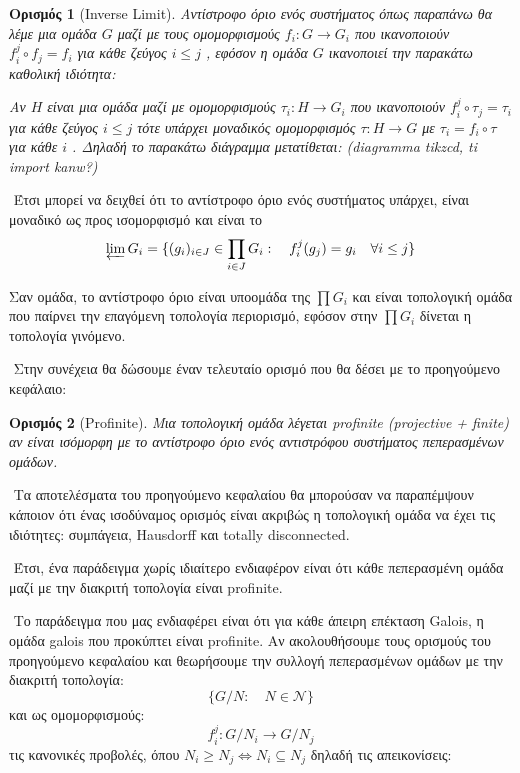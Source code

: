 \documentclass[oneside,a4paper]{article}
\newtheorem*{defn}{Ορισμός}
\newcommand {\tl}{\textlatin}
\begin{document}
\begin{defn}[\tl{Inverse Limit}] Αντίστροφο όριο ενός συστήματος όπως παραπάνω θα λέμε μια ομάδα $G$ μαζί με τους ομομορφισμούς $f_i : G \rightarrow G_i$ που ικανοποιούν $f^j_i \circ f_j = f_i$ για κάθε ζεύγος $i \leq j$ , εφόσον η ομάδα $G$ ικανοποιεί την παρακάτω καθολική ιδιότητα:

Αν $H$ είναι μια ομάδα μαζί με ομομορφισμούς $\tau_i : H \rightarrow G_i$ που ικανοποιούν $f^j_i \circ \tau_j = \tau_i$ για κάθε ζεύγος $i\leq j$ τότε υπάρχει μοναδικός ομομορφισμός $\tau : H  \rightarrow G$ με $\tau_i = f_i \circ \tau$ για κάθε $i$ . Δηλαδή το παρακάτω διάγραμμα μετατίθεται:
(diagramma tikzcd, ti import kanw?)
\end{defn}

$ $\newline
Έτσι μπορεί να δειχθεί ότι το αντίστροφο όριο ενός συστήματος υπάρχει, είναι μοναδικό ως προς ισομορφισμό και είναι το 
$$\varprojlim G_i  = \{(g_i)_{i \in J} \in \prod\limits_{i \in J} G_i : \quad f^j_i (g_j) = g_i \quad\forall i\leq j\}$$

\noindent Σαν ομάδα, το αντίστροφο όριο είναι υποομάδα της $\prod G_i$ και είναι τοπολογική ομάδα που παίρνει την επαγόμενη τοπολογία περιορισμό, εφόσον στην $\prod G_i$ δίνεται η τοπολογία γινόμενο.

$ $\newline
\noindent Στην συνέχεια θα δώσουμε έναν τελευταίο ορισμό που θα δέσει με το προηγούμενο κεφάλαιο:

\begin{defn}[\tl{Profinite}]Μια τοπολογική ομάδα λέγεται \tl{profinite (projective + finite)} αν είναι ισόμορφη με το αντίστροφο όριο ενός αντιστρόφου συστήματος πεπερασμένων ομάδων. 
\end{defn}

$ $\newline
\noindent Τα αποτελέσματα του προηγούμενο κεφαλαίου θα μπορούσαν να παραπέμψουν κάποιον ότι ένας ισοδύναμος ορισμός είναι ακριβώς η τοπολογική ομάδα να έχει τις ιδιότητες: συμπάγεια, \tl{Hausdorff} και totally disconnected.

$ $\newline
\noindent Έτσι, ένα παράδειγμα χωρίς ιδιαίτερο ενδιαφέρον είναι ότι κάθε πεπερασμένη ομάδα μαζί με την διακριτή τοπολογία είναι \tl{profinite}.

$ $\newline
\noindent Το παράδειγμα που μας ενδιαφέρει είναι ότι για κάθε άπειρη επέκταση Galois, η ομάδα galois που προκύπτει είναι profinite. Αν ακολουθήσουμε τους ορισμούς του προηγούμενο κεφαλαίου και θεωρήσουμε την συλλογή πεπερασμένων ομάδων με την διακριτή τοπολογία:
$$\{G/N: \quad N \in \mathcal{N}\}$$
και ως ομομορφισμούς:
$$f^j_i : G/N_i \longrightarrow G/N_j$$
τις κανονικές προβολές, όπου $N_i \geq N_j \iff N_i \subseteq N_j$
δηλαδή τις απεικονίσεις:
\end{document}
